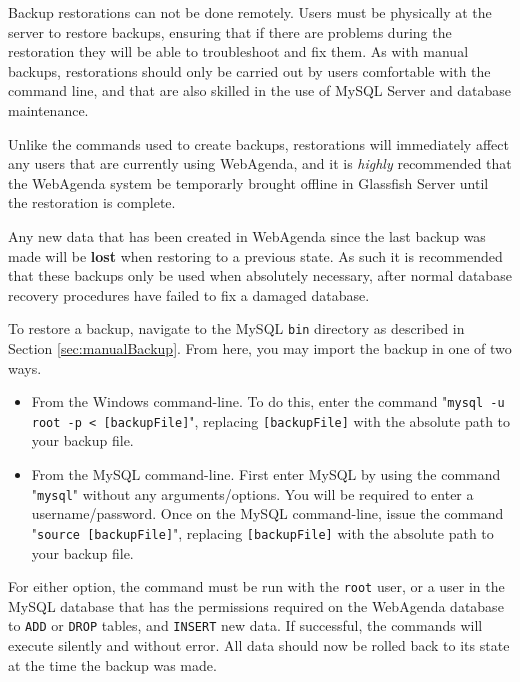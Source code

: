 \documentclass[a4paper,10pt]{report}
\begin{document}
\par \noindent \hspace*{1cm} Backup restorations can not be done remotely.  Users must be physically at the server to restore backups, ensuring that if there are problems during the restoration they will be able to troubleshoot and fix them. As with manual backups, restorations should only be carried out by users comfortable with the command line, and that are also skilled in the use of MySQL Server and database maintenance.
\bigskip
\par \noindent \hspace*{1cm} Unlike the commands used to create backups, restorations will immediately affect any users that are currently using WebAgenda, and it is \textit{highly} recommended that the WebAgenda system be temporarly brought offline in Glassfish Server until the restoration is complete.
\bigskip
\par \noindent \hspace*{1cm} Any new data that has been created in WebAgenda since the last backup was made will be \textbf{lost} when restoring to a previous state.  As such it is recommended that these backups only be used when absolutely necessary, after normal database recovery procedures have failed to fix a damaged database.
\bigskip
\par \noindent \hspace*{1cm} To restore a backup, navigate to the MySQL \verb|bin| directory as described in Section \ref{sec:manualBackup}.  From here, you may import the backup in one of two ways.

\begin{itemize}
 \item From the Windows command-line. To do this, enter the command "\verb|mysql -u root -p < [backupFile]|", replacing \verb|[backupFile]| with the absolute path to your backup file.
 \item From the MySQL command-line.  First enter MySQL by using the command "\verb|mysql|" without any arguments/options. You will be required to enter a username/password.  Once on the MySQL command-line, issue the command "\verb|source [backupFile]|", replacing \verb|[backupFile]| with the absolute path to your backup file.
\end{itemize}

\par \noindent \hspace*{1cm} For either option, the command must be run with the \verb|root| user, or a user in the MySQL database that has the permissions required on the WebAgenda database to \verb|ADD| or \verb|DROP| tables, and \verb|INSERT| new data.  If successful, the commands will execute silently and without error.  All data should now be rolled back to its state at the time the backup was made.
\end{document}

